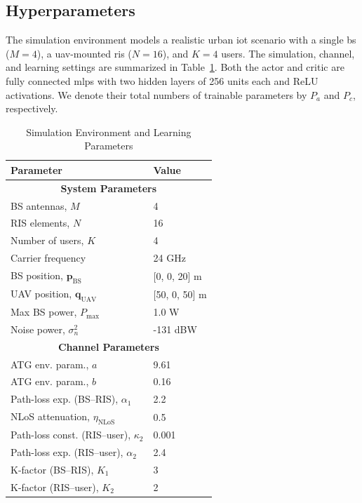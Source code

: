 \subsection{Hyperparameters}
\label{sec:hyperparameters}

The simulation environment models a realistic urban \gls{iot} scenario with a single \gls{bs} ($M=4$),
a \gls{uav}-mounted \gls{ris} ($N=16$), and $K=4$ users. The simulation, channel, and learning settings
are summarized in Table~\ref{tab:sim_learn_params}. Both the actor and critic are fully connected
\glspl{mlp} with two hidden layers of 256 units each and ReLU activations. We denote their total numbers of trainable parameters by $P_a$ and $P_c$, respectively.

\begin{table}[t]
\caption{Simulation Environment and Learning Parameters}
\label{tab:sim_learn_params}
\centering
\renewcommand{\arraystretch}{1.08}
\setlength{\tabcolsep}{5pt}
\footnotesize
\begin{tabular}{|l|l|}
\hline
\textbf{Parameter} & \textbf{Value} \\
\hline
\multicolumn{2}{|c|}{\textbf{System Parameters}} \\
\hline
BS antennas, $M$ & 4 \\
RIS elements, $N$ & 16 \\
Number of users, $K$ & 4 \\
Carrier frequency & 24 GHz \\
BS position, $\mathbf{p}_{\mathrm{BS}}$ & [0, 0, 20] m \\
UAV position, $\mathbf{q}_{\mathrm{UAV}}$ & [50, 0, 50] m \\
Max BS power, $P_{\max}$ & 1.0 W \\
Noise power, $\sigma_n^2$ & -131 dBW \\
\hline
\multicolumn{2}{|c|}{\textbf{Channel Parameters}} \\
\hline
ATG env. param., $a$ & 9.61 \\
ATG env. param., $b$ & 0.16 \\
Path-loss exp. (BS--RIS), $\alpha_1$ & 2.2 \\
NLoS attenuation, $\eta_{\mathrm{NLoS}}$ & 0.5 \\
Path-loss const. (RIS--user), $\kappa_2$ & 0.001 \\
Path-loss exp. (RIS--user), $\alpha_2$ & 2.4 \\
K-factor (BS--RIS), $K_1$ & 3 \\
K-factor (RIS--user), $K_2$ & 2 \\

\end{tabular}
\end{table}

